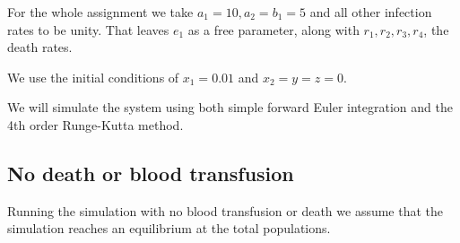 \documentclass[a4paper,10pt]{article}
\begin{document}
	For the whole assignment we take $ a_1=10, a_2=b_1=5 $ and all other infection rates to be unity. That leaves $ e_1 $ as a free parameter, along with $ r_1, r_2, r_3, r_4 $, the death rates.
	
	We use the initial conditions of $ x_1 = 0.01 $ and $ x_2=y=z =0 $.

	We will simulate the system using both simple forward Euler integration and the 4th order Runge-Kutta method.
	
	\subsection{No death or blood transfusion}
	Running the simulation with no blood transfusion or death we assume that the simulation reaches an equilibrium at the total populations. 
\end{document}
